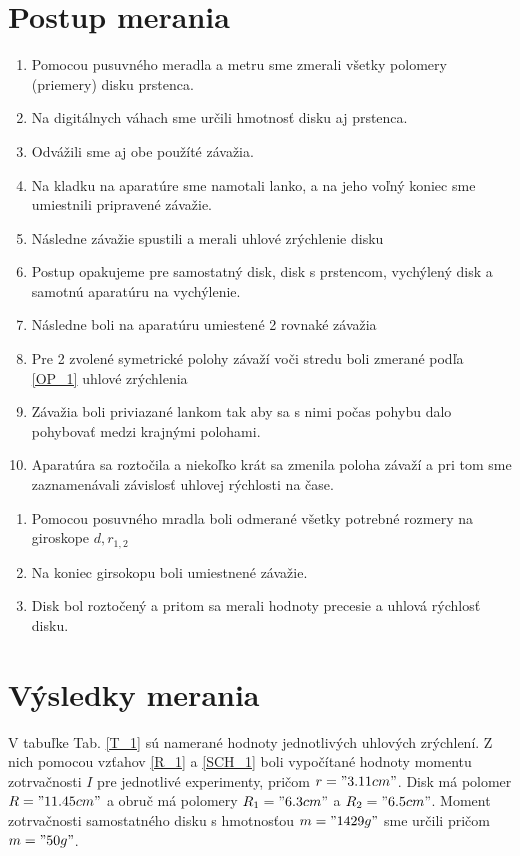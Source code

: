 \documentclass[a4paper,10pt]{article}
\begin{document}
\section{Postup merania}
\begin{enumerate}
\item Pomocou pusuvného meradla a metru sme zmerali všetky polomery (priemery) disku prstenca.
\item Na digitálnych váhach sme určili hmotnosť disku aj prstenca.
\item Odvážili sme aj obe použíté závažia.
\item Na kladku na aparatúre sme namotali lanko, a na jeho voľný koniec sme umiestnili pripravené závažie. \label{OP_1}
\item Následne závažie spustili a merali uhlové zrýchlenie disku 
\item Postup opakujeme pre samostatný disk, disk s prstencom, vychýlený disk a samotnú aparatúru na vychýlenie.
\item Následne boli na aparatúru umiestené 2 rovnaké závažia 
\item Pre 2 zvolené symetrické polohy závaží voči stredu boli zmerané podľa \ref{OP_1} uhlové zrýchlenia
\item Závažia boli priviazané lankom tak aby sa s nimi počas pohybu dalo pohybovať medzi krajnými polohami.
\item Aparatúra sa roztočila a niekoľko krát sa zmenila poloha závaží a pri tom sme zaznamenávali závislosť uhlovej rýchlosti na čase.
\end{enumerate}
\begin{enumerate}
\item Pomocou posuvného mradla boli odmerané všetky potrebné rozmery na giroskope $d,r_{1,2}$
\item Na koniec girsokopu boli umiestnené závažie.
\item Disk bol roztočený a pritom sa merali hodnoty precesie a uhlová rýchlosť disku.
\end{enumerate}

\section{Výsledky merania}
V tabuľke Tab. \ref{T_1} sú namerané hodnoty jednotlivých uhlových zrýchlení. 
Z nich pomocou vzťahov \ref{R_1} a \ref{SCH_1} boli vypočítané hodnoty momentu zotrvačnosti $I$ pre jednotlivé experimenty, pričom $r="3.11 cm"$.
Disk má polomer $R= "11.45 cm" $ a obruč má polomery $R_1="6.3 cm"$ a $R_2="6.5 cm"$.
Moment zotrvačnosti samostatného disku s hmotnosťou $m= "1429 g"$
sme určili
pričom $m = "50 g"$.
\end{document}
